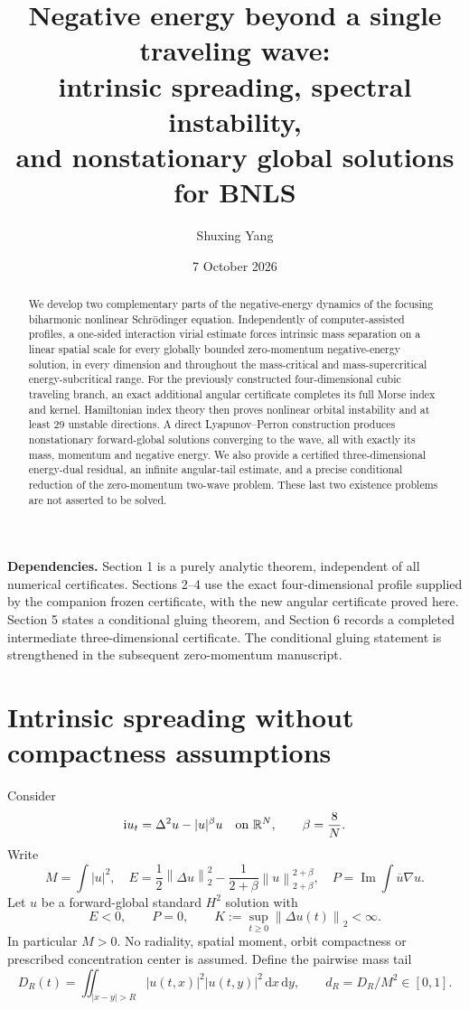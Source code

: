 \documentclass[11pt,a4paper]{article}
\title{Negative energy beyond a single traveling wave:\\intrinsic spreading, spectral instability,\\and nonstationary global solutions for BNLS}
\author{Shuxing Yang}
\date{7 October 2026}
\theoremstyle{remark}\newtheorem{remark}[theorem]{Remark}
\newcommand{\R}{\mathbb R}\newcommand{\C}{\mathbb C}
\newcommand{\ii}{\mathrm i}\newcommand{\dd}{\,\mathrm d}
\newcommand{\norm}[1]{\left\|#1\right\|}
\newcommand{\Imn}{\operatorname{Im}}\newcommand{\Ren}{\operatorname{Re}}
\begin{document}
\maketitle
\begin{abstract}
We develop two complementary parts of the negative-energy dynamics of the focusing biharmonic nonlinear Schr\"odinger equation. Independently of computer-assisted profiles, a one-sided interaction virial estimate forces intrinsic mass separation on a linear spatial scale for every globally bounded zero-momentum negative-energy solution, in every dimension and throughout the mass-critical and mass-supercritical energy-subcritical range. For the previously constructed four-dimensional cubic traveling branch, an exact additional angular certificate completes its full Morse index and kernel. Hamiltonian index theory then proves nonlinear orbital instability and at least 29 unstable directions. A direct Lyapunov--Perron construction produces nonstationary forward-global solutions converging to the wave, all with exactly its mass, momentum and negative energy. We also provide a certified three-dimensional energy-dual residual, an infinite angular-tail estimate, and a precise conditional reduction of the zero-momentum two-wave problem. These last two existence problems are not asserted to be solved.
\end{abstract}

\noindent\textbf{Dependencies.} Section 1 is a purely analytic theorem, independent of all numerical certificates. Sections 2--4 use the exact four-dimensional profile supplied by the companion frozen certificate, with the new angular certificate proved here.  Section 5 states a conditional gluing theorem, and Section 6 records a completed intermediate three-dimensional certificate. The conditional gluing statement is strengthened in the subsequent zero-momentum manuscript.

\section{Intrinsic spreading without compactness assumptions}
Consider
\begin{equation}\label{eq:bnls}
 \ii u_t=\Delta^2u-|u|^\beta u\quad\hbox{on }\R^N,
 \qquad \beta=\frac8N.
\end{equation}
Write
\[
 M=\int|u|^2,\quad E=\frac12\norm{\Delta u}_2^2-
 \frac1{2+\beta}\norm u_{2+\beta}^{2+\beta},\quad
 P=\Imn\int\overline u\nabla u.
\]
Let $u$ be a forward-global standard $H^2$ solution with
\begin{equation}\label{eq:escapehyp}
 E<0,\qquad P=0,\qquad K:=\sup_{t\ge0}\norm{\Delta u(t)}_2<\infty.
\end{equation}
In particular $M>0$. No radiality, spatial moment, orbit compactness or prescribed concentration center is assumed. Define the pairwise mass tail
\[
 D_R(t)=\iint_{|x-y|>R}|u(t,x)|^2|u(t,y)|^2\dd x\dd y,
 \qquad d_R=D_R/M^2\in[0,1].
\]
\end{document}
